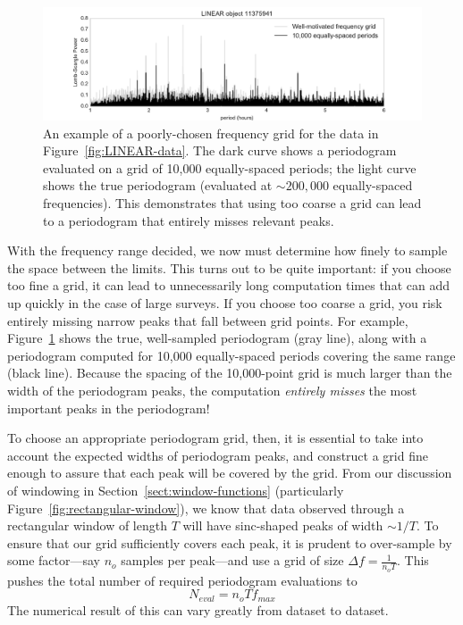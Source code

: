 \documentclass[preprint]{aastex}
\newcommand{\fig}[1]{Figure~\ref{fig:#1}}
\newcommand{\figlabel}[1]{\label{fig:#1}}
\newcommand{\eqlabel}[1]{\label{eq:#1}}
\newcommand{\Sect}[1]{Section~\ref{sect:#1}}
\newcommand{\sect}[1]{\Sect{#1}}
\begin{document}
\begin{figure}[ht]
  \centering
  \includegraphics[width=\textwidth]{fig19_LINEAR_coarse_grid}
  \caption{An example of a poorly-chosen frequency grid for the data in
    \fig{LINEAR-data}. The dark curve shows a periodogram evaluated on a
    grid of 10,000 equally-spaced periods; the light curve shows the true
    periodogram (evaluated at ${\sim}200,000$ equally-spaced frequencies).
    This demonstrates that using too coarse a grid can lead to a periodogram
    that entirely misses relevant peaks.
    \figlabel{LINEAR-coarse-grid}}
\end{figure}

With the frequency range decided, we now must determine how finely to sample
the space between the limits.
This turns out to be quite important: if you choose too fine a grid, it can
lead to unnecessarily long computation times that can add up quickly in the
case of large surveys. If you choose too coarse a grid, you
risk entirely missing narrow peaks that fall between grid points.
For example, \fig{LINEAR-coarse-grid} shows the true, well-sampled periodogram
(gray line), along with a periodogram computed for 10,000 equally-spaced
periods covering the same range (black line).
Because the spacing of the 10,000-point grid is much larger than the width of
the periodogram peaks, the computation {\it entirely misses} the most
important peaks in the periodogram!

To choose an appropriate periodogram grid, then, it is essential to take into
account the expected widths of periodogram peaks, and construct a grid fine
enough to assure that each peak will be covered by the grid.
From our discussion of windowing in \sect{window-functions}
(particularly \fig{rectangular-window}), we know that data observed through a
rectangular window of length $T$ will have sinc-shaped peaks of width
$\sim 1/T$.
To ensure that our grid sufficiently covers each peak, it is prudent to
over-sample by some factor---say $n_o$ samples per peak---and use a grid of size
$\Delta f = \frac{1}{n_o T}$. This pushes the total number of required
periodogram evaluations to
\begin{equation}
  \eqlabel{n-eval}
  N_{eval} = n_o T f_{max}
\end{equation}
The numerical result of this can vary greatly from dataset to dataset.
\end{document}
